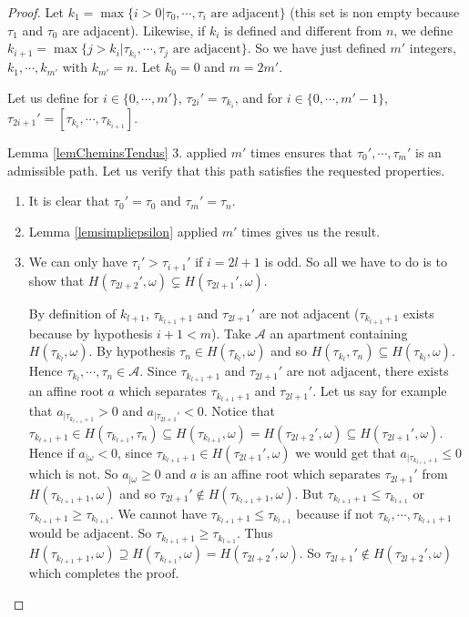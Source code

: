 \documentclass[a4paper,10pt]{amsart}
\begin{document}
\begin{proof}
Let $k_{1}=\max \{ i>0 | \tau_{0},\cdots,\tau_{i} \text{ are adjacent}\}$ (this set is non empty because $\tau_{1}$ and $\tau_{0}$ are adjacent). Likewise, if $k_{i}$ is defined and different from $n$, we define $k_{i+1}=\max \{ j>k_{i} | \tau_{k_{i}},\cdots,\tau_{j} \text{ are adjacent}\}$. So we have just defined $m'$ integers, $k_{1},\cdots,k_{m'}$ with $k_{m'}=n$. Let $k_{0}=0$ and $m=2m'$.


Let us define for $i\in \{0,\cdots,m'\}$, $\tau_{2i}'=\tau_{k_{i}}$, and for $i\in \{0,\cdots,m'-1\}$, $\tau_{2i+1}'=[\tau_{k_{i}},\cdots,\tau_{k_{i+1}}]$.

Lemma \ref{lemCheminsTendus} 3. applied $m'$ times ensures that $\tau_{0}',\cdots,\tau_{m}'$ is an admissible path. Let us verify that this path satisfies the requested properties.

\begin{enumerate}
\item It is clear that $\tau_{0}'=\tau_{0}$ and $\tau_{m}'=\tau_{n}$.

\item Lemma \ref{lemsimpliepsilon} applied $m'$ times gives us the result.


\item 
We can only have $\tau_{i}'>\tau_{i+1}'$ if $i=2l+1$ is odd. So all we have to do is to show that $H(\tau_{2l+2}',\omega)\varsubsetneq H(\tau_{2l+1}',\omega)$.

By definition of $k_{l+1}$, $\tau_{k_{l+1}+1}$ and $\tau_{2l+1}'$ are not adjacent ($\tau_{k_{l+1}+1}$ exists because by hypothesis $i+1<m$). Take $\mathcal{A}$ an apartment containing $H(\tau_{k_{l}},\omega)$. By hypothesis $\tau_{n} \in H(\tau_{k_{l}},\omega)$ and so $H(\tau_{k_{l}},\tau_{n}) \subseteq H(\tau_{k_{l}},\omega)$. Hence $\tau_{k_{l}}, \cdots, \tau_{n} \in \mathcal{A}$. Since $\tau_{k_{l+1}+1}$ and $\tau_{2l+1}'$ are not adjacent, there exists an affine root $a$ which separates $\tau_{k_{l+1}+1}$ and $\tau_{2l+1}'$. Let us say for example that $a_{|\tau_{k_{l+1}+1}}>0$ and $a_{|\tau_{2l+1}'}<0$. Notice that $\tau_{k_{l+1}+1} \in H(\tau_{k_{l+1}},\tau_{n})\subseteq H(\tau_{k_{l+1}},\omega)=H(\tau_{2l+2}',\omega) \subseteq H(\tau_{2l+1}',\omega)$. Hence if $a_{|\omega}<0$, since $\tau_{k_{l+1}+1} \in H(\tau_{2l+1}',\omega)$ we would get that $a_{|\tau_{k_{l+1}+1}}\leq 0$ which is not. So $a_{|\omega}\geq 0$ and $a$ is an affine root which separates $\tau_{2l+1}'$ from $H(\tau_{k_{l+1}+1},\omega)$ and so $\tau_{2l+1}' \notin H(\tau_{k_{l+1}+1},\omega)$. But $\tau_{k_{l+1}+1}\leq \tau_{k_{l+1}}$ or $\tau_{k_{l+1}+1}\geq \tau_{k_{l+1}}$. We cannot have $\tau_{k_{l+1}+1}\leq \tau_{k_{l+1}}$ because if not $\tau_{k_{l}},\cdots,\tau_{k_{l+1}+1}$ would be adjacent. So $\tau_{k_{l+1}+1}\geq \tau_{k_{l+1}}$. Thus $H(\tau_{k_{l+1}+1},\omega) \supseteq H(\tau_{k_{l+1}},\omega)=H(\tau_{2l+2}',\omega)$. So $\tau_{2l+1}' \notin H(\tau_{2l+2}',\omega)$ which completes the proof.



\end{enumerate}
\end{proof}
\end{document}
